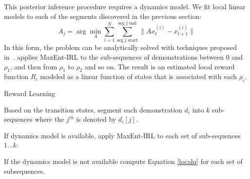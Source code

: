 This posterior inference procedure requires a dynamics model. We fit local linear models to each of the segments discovered in the previous section:
\[
A_j = \arg\min_{A} \sum_{i=1}^N \sum_{\text{seg j start}}^{\text{seg j end}} \|A x^{(i)}_{t} - x^{(i)}_{t+1}\|
\]
In this form, the problem can be analytically solved with techniques proposed in~\cite{ziebart2012probabilistic}.
\hirl applies MaxEnt-IRL to the sub-sequences of demonstrations between 0 and $\rho_1$, and then from $\rho_1$ to $\rho_2$ and so on.
The result is an estimated local reward function $R_{i}$ modeled as a linear function of states that is associated with each $\rho_i$.

\iffalse
\subsubsection{Application Scenarios} While typically RL is applied in scenarios where dynamics models are unavailable, there are scenarios in which the model-based reward approach applies. Suppose we are given demonstrations of a known system, e.g., a simulator or a simplified version of a task, with different dynamics $P'$ but with the same overall task structure.
While a policy learned in this setting would not transfer due to a change in dynamics, the reward function would.
In our experiments, we demonstrate an example of this on a surgical cutting task where the robot has to cut along a marked line in gauze.
We demonstrate cutting trajectories on a simplified cutting problem where the demonstrator quasi-statically traces the line without cutting it.
Here there are known dynamics and we can learn transitions and local rewards (e.g., learning to follow the line).
This reward can transfer to the policy learning phase, in which we can try to cut the gauze introducing unknown dynamics.
\fi


\begin{phase}[t]
\small
\DontPrintSemicolon
\caption{Reward Learning \label{alg:tsh2}}

Based on the transition states, segment each demonstration $d_i$ into $k$ sub-sequences where the $j^{th}$ is denoted by $d_i[j]$.

If dynamics model is available, apply MaxEnt-IRL to each set of sub-sequences $1...k$.

If the dynamics model is not available compute Equation \ref{localq} for each set of subsequences.

\end{phase}

